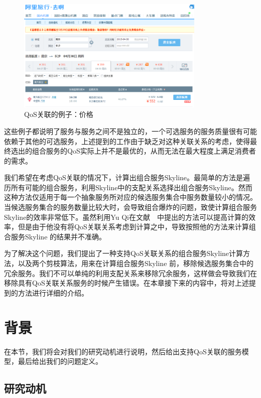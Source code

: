 \begin{figure}[thb]
    \centering
    \includegraphics[width=0.8\textwidth]{./FIGs/Fig_CorrExmpAli.png}
    \caption{QoS关联的例子：价格}
    \label{F:Fig_CorrExmpAli}
\end{figure}

这些例子都说明了服务与服务之间不是独立的，一个可选服务的服务质量很有可能依赖于其他的可选服务，上述提到的工作由于缺乏对这种关联关系的考虑，使得最终选出的组合服务的QoS实际上并不是最优的，从而无法在最大程度上满足消费者的需求。

我们希望在考虑QoS关联的情况下，计算出组合服务Skyline。最简单的方法是遍历所有可能的组合服务，利用Skyline中的支配关系选择出组合服务Skyline。然而这种方法仅适用于每一个抽象服务所对应的候选服务集合中服务数量较小的情况。当候选服务集合的服务数量比较大时，会导致组合爆炸的问题，致使计算组合服务Skyline的效率非常低下。虽然利用Yu Qi在文献~\cite{yu2013efficient}~中提出的方法可以提高计算的效率，但是由于他没有将QoS关联关系考虑到计算之中，导致按照他的方法来计算组合服务Skyline 的结果并不准确。

为了解决这个问题，我们提出了一种支持QoS关联关系的组合服务Skyline计算方法，以及两个剪枝算法，用来在计算组合服务Skyline 前，移除候选服务集合中的冗余服务。我们不可以单纯的利用支配关系来移除冗余服务，这样做会导致我们在移除具有QoS关联关系服务的时候产生错误。在本章接下来的内容中，将对上述提到的方法进行详细的介绍。

\section{背景}

在本节，我们将会对我们的研究动机进行说明，然后给出支持QoS关联的服务模型，最后给出我们的问题定义。

\subsection{研究动机}\label{S:SEC_Motivation}

